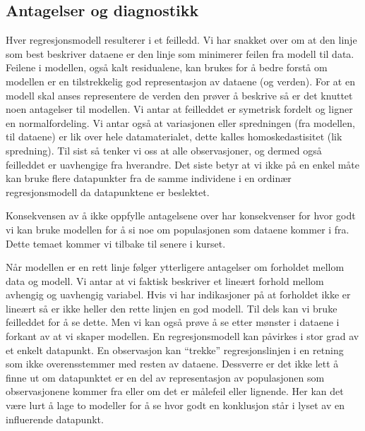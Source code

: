 \documentclass[
  letterpaper,
  DIV=11,
  numbers=noendperiod,
  oneside]{scrreprt}
\begin{document}
\hypertarget{antagelser-og-diagnostikk}{%
\subsection{Antagelser og diagnostikk}\label{antagelser-og-diagnostikk}}

Hver regresjonsmodell resulterer i et feilledd. Vi har snakket over om at den
linje som best beskriver dataene er den linje som minimerer feilen fra
modell til data. Feilene i modellen, også kalt residualene, kan brukes
for å bedre forstå om modellen er en tilstrekkelig god representasjon av
dataene (og verden). For at en modell skal anses representere de verden
den prøver å beskrive så er det knuttet noen antagelser til modellen. Vi
antar at feilleddet er symetrisk fordelt og ligner en
normalfordeling. Vi antar også at
variasjonen eller spredningen (fra modellen, til dataene) er lik over
hele datamaterialet, dette kalles homoskedastisitet (lik spredning). Til
sist så tenker vi oss at alle observasjoner, og dermed også feilleddet
er uavhengige fra hverandre. Det siste betyr at vi ikke på en enkel måte
kan bruke flere datapunkter fra de samme individene i en ordinær
regresjonsmodell da datapunktene er beslektet.

Konsekvensen av å ikke oppfylle antagelsene over har konsekvenser for
hvor godt vi kan bruke modellen for å si noe om populasjonen som dataene
kommer i fra. Dette temaet kommer vi tilbake til senere i kurset.

Når modellen er en rett linje følger ytterligere antagelser om forholdet
mellom data og modell. Vi antar at vi faktisk beskriver et lineært
forhold mellom avhengig og uavhengig variabel. Hvis vi har indikasjoner
på at forholdet ikke er lineært så er ikke heller den rette linjen en
god modell. Til dels kan vi bruke feilleddet for å se dette. Men vi kan
også prøve å se etter mønster i dataene i forkant av at vi skaper
modellen. En regresjonsmodell kan påvirkes i stor grad av et enkelt
datapunkt. En observasjon kan ``trekke'' regresjonslinjen i en retning
som ikke overensstemmer med resten av dataene. Dessverre er det ikke
lett å finne ut om datapunktet er en del av representasjon av
populasjonen som observasjonene kommer fra eller om det er målefeil
eller lignende. Her kan det være lurt å lage to modeller for å se hvor
godt en konklusjon står i lyset av en influerende datapunkt.
\end{document}
